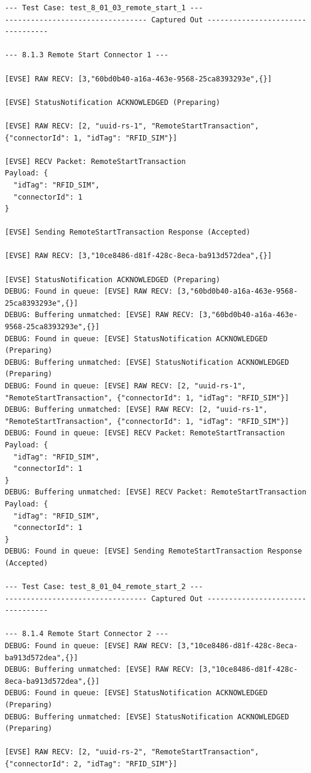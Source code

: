 \documentclass{article}
\begin{document}
\begin{lstlisting}
--- Test Case: test_8_01_03_remote_start_1 ---
--------------------------------- Captured Out ---------------------------------

--- 8.1.3 Remote Start Connector 1 ---

[EVSE] RAW RECV: [3,"60bd0b40-a16a-463e-9568-25ca8393293e",{}]

[EVSE] StatusNotification ACKNOWLEDGED (Preparing)

[EVSE] RAW RECV: [2, "uuid-rs-1", "RemoteStartTransaction", {"connectorId": 1, "idTag": "RFID_SIM"}]

[EVSE] RECV Packet: RemoteStartTransaction
Payload: {
  "idTag": "RFID_SIM",
  "connectorId": 1
}

[EVSE] Sending RemoteStartTransaction Response (Accepted)

[EVSE] RAW RECV: [3,"10ce8486-d81f-428c-8eca-ba913d572dea",{}]

[EVSE] StatusNotification ACKNOWLEDGED (Preparing)
DEBUG: Found in queue: [EVSE] RAW RECV: [3,"60bd0b40-a16a-463e-9568-25ca8393293e",{}]
DEBUG: Buffering unmatched: [EVSE] RAW RECV: [3,"60bd0b40-a16a-463e-9568-25ca8393293e",{}]
DEBUG: Found in queue: [EVSE] StatusNotification ACKNOWLEDGED (Preparing)
DEBUG: Buffering unmatched: [EVSE] StatusNotification ACKNOWLEDGED (Preparing)
DEBUG: Found in queue: [EVSE] RAW RECV: [2, "uuid-rs-1", "RemoteStartTransaction", {"connectorId": 1, "idTag": "RFID_SIM"}]
DEBUG: Buffering unmatched: [EVSE] RAW RECV: [2, "uuid-rs-1", "RemoteStartTransaction", {"connectorId": 1, "idTag": "RFID_SIM"}]
DEBUG: Found in queue: [EVSE] RECV Packet: RemoteStartTransaction
Payload: {
  "idTag": "RFID_SIM",
  "connectorId": 1
}
DEBUG: Buffering unmatched: [EVSE] RECV Packet: RemoteStartTransaction
Payload: {
  "idTag": "RFID_SIM",
  "connectorId": 1
}
DEBUG: Found in queue: [EVSE] Sending RemoteStartTransaction Response (Accepted)

--- Test Case: test_8_01_04_remote_start_2 ---
--------------------------------- Captured Out ---------------------------------

--- 8.1.4 Remote Start Connector 2 ---
DEBUG: Found in queue: [EVSE] RAW RECV: [3,"10ce8486-d81f-428c-8eca-ba913d572dea",{}]
DEBUG: Buffering unmatched: [EVSE] RAW RECV: [3,"10ce8486-d81f-428c-8eca-ba913d572dea",{}]
DEBUG: Found in queue: [EVSE] StatusNotification ACKNOWLEDGED (Preparing)
DEBUG: Buffering unmatched: [EVSE] StatusNotification ACKNOWLEDGED (Preparing)

[EVSE] RAW RECV: [2, "uuid-rs-2", "RemoteStartTransaction", {"connectorId": 2, "idTag": "RFID_SIM"}]


\end{lstlisting}
\end{document}
